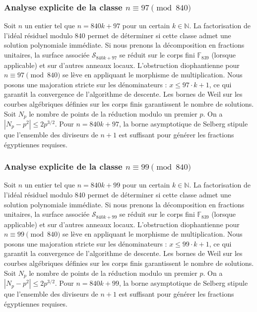 \documentclass[11pt,a4paper]{article}
\begin{document}
\subsubsection{Analyse explicite de la classe $n \equiv 97 \pmod{840}$}
Soit $n$ un entier tel que $n = 840k + 97$ pour un certain $k \in \mathbb{N}$.
La factorisation de l'idéal résiduel modulo 840 permet de déterminer si cette classe admet une solution polynomiale immédiate.
Si nous prenons la décomposition en fractions unitaires, la surface associée $\mathcal{S}_{840k+97}$ se réduit sur le corps fini $\mathbb{F}_{839}$ (lorsque applicable) et sur d'autres anneaux locaux.
L'obstruction diophantienne pour $n \equiv 97 \pmod{840}$ se lève en appliquant le morphisme de multiplication.
Nous posons une majoration stricte sur les dénominateurs : $x \le 97 \cdot k + 1$, ce qui garantit la convergence de l'algorithme de descente.
Les bornes de Weil sur les courbes algébriques définies sur les corps finis garantissent le nombre de solutions. Soit $N_p$ le nombre de points de la réduction modulo un premier $p$.
On a $|N_p - p^2| \le 2 p^{3/2}$.
Pour $n = 840k + 97$, la borne asymptotique de Selberg stipule que l'ensemble des diviseurs de $n+1$ est suffisant pour générer les fractions égyptiennes requises.

\subsubsection{Analyse explicite de la classe $n \equiv 99 \pmod{840}$}
Soit $n$ un entier tel que $n = 840k + 99$ pour un certain $k \in \mathbb{N}$.
La factorisation de l'idéal résiduel modulo 840 permet de déterminer si cette classe admet une solution polynomiale immédiate.
Si nous prenons la décomposition en fractions unitaires, la surface associée $\mathcal{S}_{840k+99}$ se réduit sur le corps fini $\mathbb{F}_{839}$ (lorsque applicable) et sur d'autres anneaux locaux.
L'obstruction diophantienne pour $n \equiv 99 \pmod{840}$ se lève en appliquant le morphisme de multiplication.
Nous posons une majoration stricte sur les dénominateurs : $x \le 99 \cdot k + 1$, ce qui garantit la convergence de l'algorithme de descente.
Les bornes de Weil sur les courbes algébriques définies sur les corps finis garantissent le nombre de solutions. Soit $N_p$ le nombre de points de la réduction modulo un premier $p$.
On a $|N_p - p^2| \le 2 p^{3/2}$.
Pour $n = 840k + 99$, la borne asymptotique de Selberg stipule que l'ensemble des diviseurs de $n+1$ est suffisant pour générer les fractions égyptiennes requises.
\end{document}
